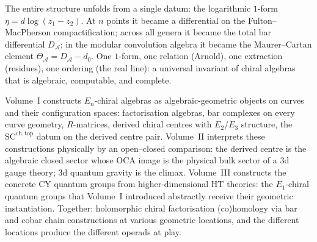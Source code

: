 \documentclass[11pt,reqno]{amsart}
\theoremstyle{definition}
\theoremstyle{remark}
\providecommand{\cA}{\mathcal{A}}
\providecommand{\SCchtop}{\mathrm{SC}^{\mathrm{ch,top}}}
\numberwithin{equation}{section}
\begin{document}
\bigskip

\noindent
The entire structure unfolds from a single datum: the
logarithmic $1$-form $\eta = d\log(z_1 - z_2)$. At $n$ points
it became a differential on the Fulton--MacPherson
compactification; across all genera it became the total bar
differential $D_\cA$; in the modular convolution algebra it
became the Maurer--Cartan element $\Theta_\cA = D_\cA - d_0$.
One $1$-form, one relation (Arnold), one extraction (residues),
one ordering (the real line): a universal invariant of chiral
algebras that is algebraic, computable, and complete.

Volume~I constructs $E_n$-chiral algebras as
algebraic-geometric objects on curves and their configuration
spaces: factorisation algebras, bar complexes on every curve
geometry, $R$-matrices, derived chiral centres with
$E_2$/$E_3$ structure, the $\SCchtop$ datum on the derived
centre pair. Volume~II interprets these constructions
physically by an open--closed comparison: the derived centre is the
algebraic closed sector whose OCA image is the physical bulk sector
of a 3d gauge theory; 3d quantum gravity is the climax. Volume~III
constructs the concrete CY quantum groups from
higher-dimensional HT theories: the
$E_1$-chiral quantum groups that Volume~I introduced abstractly
receive their geometric instantiation. Together: holomorphic
chiral factorisation (co)homology via bar and cobar chain
constructions at various geometric locations, and the different
locations produce the different operads at play.
\end{document}
